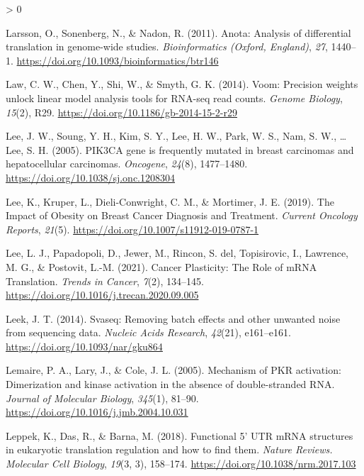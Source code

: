 \documentclass[
  12pt,
  openany]{book}
\newlength{\cslhangindent}
\newenvironment{CSLReferences}[2] %
 {%
  \setlength{\parindent}{0pt}
  \ifodd #1 \everypar{\setlength{\hangindent}{\cslhangindent}}\ignorespaces\fi
  \ifnum #2 > 0
  \setlength{\parskip}{#2\baselineskip}
  \fi
 }%
 {}
\begin{document}
\begin{CSLReferences}{1}{0}
\leavevmode\hypertarget{ref-Larsson2011}{}%
Larsson, O., Sonenberg, N., \& Nadon, R. (2011). Anota: {Analysis} of differential translation in genome-wide studies. \emph{Bioinformatics (Oxford, England)}, \emph{27}, 1440--1. \url{https://doi.org/10.1093/bioinformatics/btr146}

\leavevmode\hypertarget{ref-Law2014}{}%
Law, C. W., Chen, Y., Shi, W., \& Smyth, G. K. (2014). Voom: Precision weights unlock linear model analysis tools for {RNA}-seq read counts. \emph{Genome Biology}, \emph{15}(2), R29. \url{https://doi.org/10.1186/gb-2014-15-2-r29}

\leavevmode\hypertarget{ref-Lee2005}{}%
Lee, J. W., Soung, Y. H., Kim, S. Y., Lee, H. W., Park, W. S., Nam, S. W., \ldots{} Lee, S. H. (2005). {PIK3CA} gene is frequently mutated in breast carcinomas and hepatocellular carcinomas. \emph{Oncogene}, \emph{24}(8), 1477--1480. \url{https://doi.org/10.1038/sj.onc.1208304}

\leavevmode\hypertarget{ref-Lee2019}{}%
Lee, K., Kruper, L., Dieli-Conwright, C. M., \& Mortimer, J. E. (2019). The {Impact} of {Obesity} on {Breast Cancer Diagnosis} and {Treatment}. \emph{Current Oncology Reports}, \emph{21}(5). \url{https://doi.org/10.1007/s11912-019-0787-1}

\leavevmode\hypertarget{ref-Lee2021}{}%
Lee, L. J., Papadopoli, D., Jewer, M., Rincon, S. del, Topisirovic, I., Lawrence, M. G., \& Postovit, L.-M. (2021). Cancer {Plasticity}: {The Role} of {mRNA Translation}. \emph{Trends in Cancer}, \emph{7}(2), 134--145. \url{https://doi.org/10.1016/j.trecan.2020.09.005}

\leavevmode\hypertarget{ref-Leek2014}{}%
Leek, J. T. (2014). Svaseq: Removing batch effects and other unwanted noise from sequencing data. \emph{Nucleic Acids Research}, \emph{42}(21), e161--e161. \url{https://doi.org/10.1093/nar/gku864}

\leavevmode\hypertarget{ref-Lemaire2005}{}%
Lemaire, P. A., Lary, J., \& Cole, J. L. (2005). Mechanism of {PKR} activation: Dimerization and kinase activation in the absence of double-stranded {RNA}. \emph{Journal of Molecular Biology}, \emph{345}(1), 81--90. \url{https://doi.org/10.1016/j.jmb.2004.10.031}

\leavevmode\hypertarget{ref-Leppek2018}{}%
Leppek, K., Das, R., \& Barna, M. (2018). Functional 5' {UTR mRNA} structures in eukaryotic translation regulation and how to find them. \emph{Nature Reviews. Molecular Cell Biology}, \emph{19}(3, 3), 158--174. \url{https://doi.org/10.1038/nrm.2017.103}


\end{CSLReferences}
\end{document}
